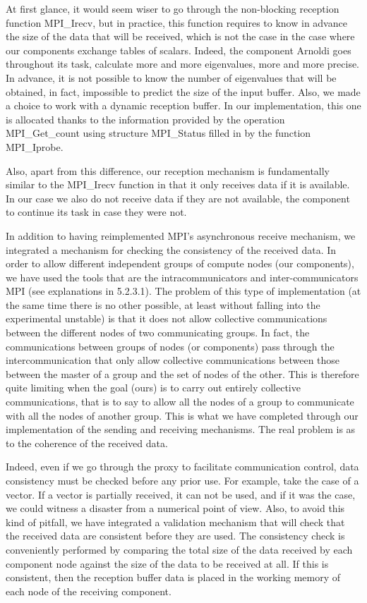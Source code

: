 At first glance, it would seem wiser to go through the non-blocking reception function MPI\_Irecv, but in practice, this function requires to know in advance the size of the data that will be received, which is not the case in the case where our components exchange tables of scalars. Indeed, the component Arnoldi goes throughout its task, calculate more and more eigenvalues, more and more precise. In advance, it is not possible to know the number of eigenvalues that will be obtained, in fact, impossible to predict the size of the input buffer. Also, we made a choice to work with a dynamic reception buffer. In our implementation, this one is allocated thanks to the information provided by the operation MPI\_Get\_count using structure MPI\_Status filled in by the function MPI\_Iprobe.

Also, apart from this difference, our reception mechanism is fundamentally similar to the MPI\_Irecv function in that it only receives data if it is available. In our case we also do not receive data if they are not available, the component to continue its task in case they were not. 

In addition to having reimplemented MPI's asynchronous receive mechanism, we integrated a mechanism for checking the consistency of the received data. In order to allow different independent groups of compute nodes (our components), we have used the tools that are the intracommunicators and inter-communicators MPI (see explanations in 5.2.3.1). The problem of this type of implementation (at the same time there is no other possible, at least without falling into the experimental unstable) is that it does not allow collective communications between the different nodes of two communicating groups. In fact, the communications between groups of nodes (or components) pass through the intercommunication that only allow collective communications between those between the master of a group and the set of nodes of the other. This is therefore quite limiting when the goal (ours) is to carry out entirely collective communications, that is to say to allow all the nodes of a group to communicate with all the nodes of another group. This is what we have completed through our implementation of the sending and receiving mechanisms. The real problem is as to the coherence of the received data.

Indeed, even if we go through the proxy to facilitate communication control, data consistency must be checked before any prior use. For example, take the case of a vector. If a vector is partially received, it can not be used, and if it was the case, we could witness a disaster from a numerical point of view. Also, to avoid this kind of pitfall, we have integrated a validation mechanism that will check that the received data are consistent before they are used. The consistency check is conveniently performed by comparing the total size of the data received by each component node against the size of the data to be received at all. If this is consistent, then the reception buffer data is placed in the working memory of each node of the receiving component.


